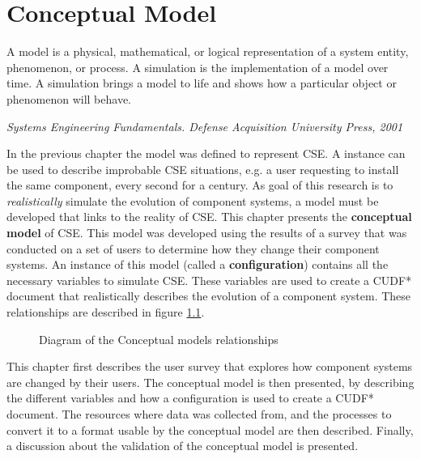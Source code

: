 \chapter{Conceptual Model}
\label{simulation}
\epigraph{A model is a physical, mathematical, or logical representation of a system entity, phenomenon, or process. 
A simulation is the implementation of a model over time. 
A simulation brings a model to life and shows how a particular object or phenomenon will behave.}
{\textit{Systems Engineering Fundamentals. Defense Acquisition University Press, 2001}}

In the previous chapter the \modelname model was defined to represent CSE.
A \modelname instance can be used to describe improbable CSE situations, 
e.g. a user requesting to install the same component, every second for a century.
As goal of this research is to \textit{realistically} simulate the evolution of component systems, 
a model must be developed that links \modelname to the reality of CSE.
This chapter presents the \textbf{conceptual model} of CSE.
This model was developed using the results of a survey that was conducted on a set of users to determine how they change their component systems.
An instance of this model (called a \textbf{configuration}) contains all the necessary variables to simulate CSE.
These variables are used to create a CUDF* document that realistically describes the evolution of a component system.
These relationships are described in figure \ref{sim.modeldiagram}.

\begin{figure}[htp]
\begin{center}
  \caption{Diagram of the Conceptual models relationships}
  \label{sim.modeldiagram}
\end{center}
\end{figure}

This chapter first describes the user survey that explores how component systems are changed by their users.
The conceptual model is then presented, by describing the different variables and how a configuration is used to create a CUDF* document.
The resources where data was collected from, and the processes to convert it to a format usable by the conceptual model are then described.
Finally, a discussion about the validation of the conceptual model is presented.

